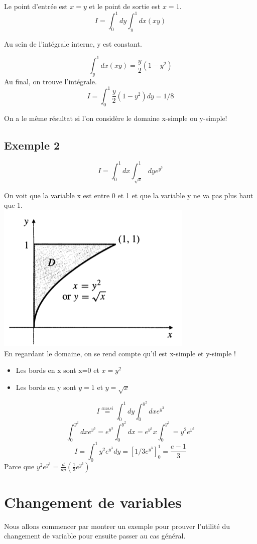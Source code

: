 Le point d'entrée est $x=y$ et le point de sortie est $x=1$.
\[I=\int_0^1dy\int_y^1dx(xy)\]

Au sein de l'intégrale interne, y est constant.

\[\int_y^1dx(xy) = \frac{y}{2}(1-y^2)\]
Au final, on trouve l'intégrale.
\[I = \int_0^1 \frac{y}{2}(1-y^2) dy = 1/8\]

On a le même résultat si l'on considère le domaine x-simple ou y-simple!

\subsection{Exemple 2}
\[I = \int_0^1dx \int_{\sqrt{x}}^1 dy e^{y^3}\]

On voit que la variable x est entre 0 et 1 et que la variable y ne va pas plus haut que 1.
\\
\includegraphics[scale=0.5]{image4.png}
\\

En regardant le domaine, on se rend compte qu'il est x-simple et y-simple !
\begin{itemize}

\item Les bords en x sont x=0 et $x=y^2$
\item Les bords en y sont $y=1$ et $y=\sqrt{x}$


\end{itemize}

\[I \overset{aussi}{=}\int_0^1dy \int_0^{y^2} dx e^{y^3}\]
\[\int_0^{y^2} dx e^{y^3} = e^{y^3} \int_0^{y^2} dx = e^{y^3} x \int_0^{y^2} = y^2 e^{y^3}\]
\[I=\int_0^1 y^2 e^{y^3} dy = \left[1/3 e ^{y^3}\right]_0^1  = \frac{e-1}{3}\]
Parce que
$y^2 e^{y^3} = \frac{d}{dy}(\frac{1}{3} e^{y^3})$

\section{Changement de variables}
Nous allons commencer par montrer un exemple pour prouver l'utilité du changement de variable pour ensuite passer au cas général.
